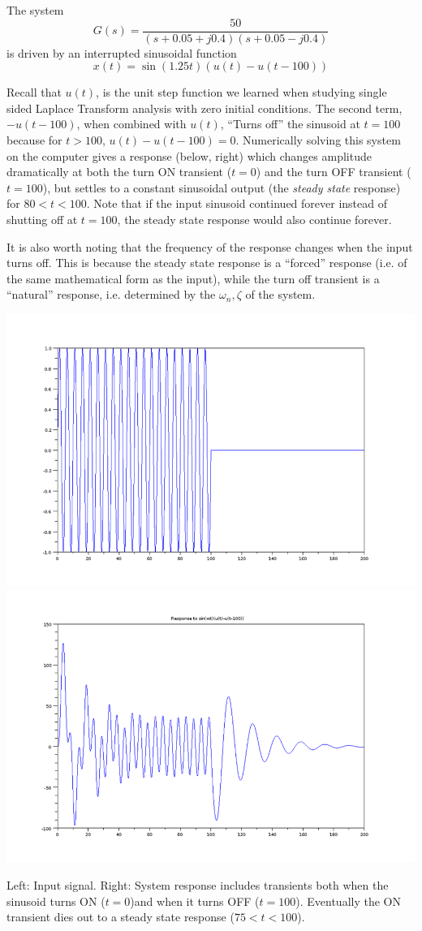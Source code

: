 \begin{Example}
  The system
\[
G(s) = \frac{50}{(s+0.05+j0.4)(s+0.05-j0.4)}
\]
is driven by an interrupted  sinusoidal function
\[
x(t) = \sin(1.25t)(u(t)-u(t-100))
\]

Recall that $u(t)$, is the unit step function we learned when studying single sided Laplace Transform analysis with zero initial conditions.  The second term, $-u(t-100)$, when combined with $u(t)$, ``Turns off'' the sinusoid at $t=100$ because for $t>100$, $u(t)-u(t-100) = 0$.
Numerically solving this system on the computer gives a response (below, right) which changes amplitude dramatically at both the turn ON transient ($t=0$) and the turn OFF transient ($t=100$), but settles to a constant sinusoidal output (the {\it steady state} response) for $80< t < 100$.  Note that if the input sinusoid continued forever instead of shutting off at $t=100$, the steady state response would also continue forever.

It is also worth noting that the frequency of the response changes when the input turns off.   This is because the steady state response is a ``forced'' response (i.e. of the same mathematical form as the input), while the turn off transient is a ``natural'' response, i.e. determined by the $\omega_n, \zeta$ of the system.


\includegraphics[width=3.in]{figs05/sinusoid_input_stepa.png}
\includegraphics[width=3.in]{figs05/sinusoid_transienta.png}

Left:  Input signal. Right: System response includes transients both when the sinusoid turns ON ($t=0$)and when it turns OFF ($t=100$).
Eventually the ON transient dies out to a steady state response ($75<t<100$).

\end{Example}

